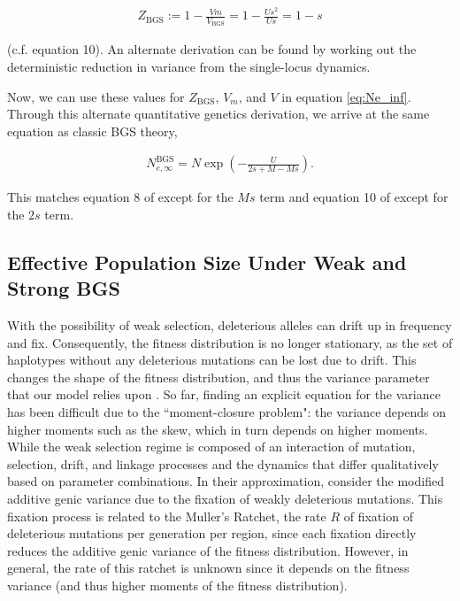 \documentclass[11pt]{article}
\begin{document}
\begin{align}
  Z_\text{BGS} := 1 - \frac{Vm}{V_\text{BGS}} = 1 - \frac{Us^2}{Us} = 1 - s
\end{align}

(c.f. \cite{Santiago1998-bs} equation 10). An alternate derivation can be found
by working out the deterministic reduction in variance from the single-locus
dynamics. 

Now, we can use these values for $Z_\text{BGS}$, $V_m$, and $V$ in equation
\eqref{eq:Ne_inf}. Through this alternate quantitative genetics derivation, we
arrive at the same equation as classic BGS theory,

\begin{align}
  N_{e,\infty}^\text{BGS} = N \exp\left( - \frac{U}{2s + M - Ms} \right).
\end{align}

This matches equation 8 of \textcite{Hudson1995-xc} except for the $Ms$ term
and equation 10 of \textcite{Nordborg1996-nq} except for the $2s$ term.

\subsection*{Effective Population Size Under Weak and Strong BGS} \label{supp:weak-strong}

With the possibility of weak selection, deleterious alleles can drift up in
frequency and fix. Consequently, the fitness distribution is no longer
stationary, as the set of haplotypes without any deleterious mutations can be
lost due to drift. This changes the shape of the fitness distribution, and thus
the variance parameter that our model relies upon
\parencite{Gessler1995-hz,OFallon2010-my,Good2013-lp,Haigh1978-gt,Higgs1995-xc}.
So far, finding an explicit equation for the variance has been difficult due to
the ``moment-closure problem": the variance depends on higher moments such as
the skew, which in turn depends on higher moments. While the weak selection
regime is composed of an interaction of mutation, selection, drift, and linkage
processes and the dynamics that differ qualitatively based on parameter
combinations. In their approximation, \textcite{Santiago2016-mu} consider the
modified additive genic variance due to the fixation of weakly deleterious
mutations. This fixation process is related to the Muller's Ratchet, the rate
$R$ of fixation of deleterious mutations per generation per region, since each
fixation directly reduces the additive genic variance of the fitness
distribution. However, in general, the rate of this ratchet is unknown since it
depends on the fitness variance (and thus higher moments of the fitness
distribution).
\end{document}
